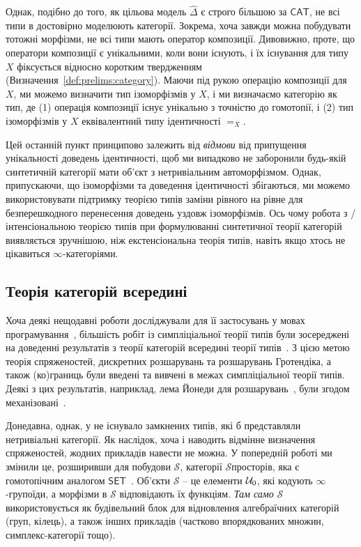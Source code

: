\documentclass[12pt]{article}
\newcommand{\textcite}{\cite}
\newcommand{\parencite}{\cite}
\newcommand{\Space}{\mathcal{S}}
\newcommand{\CAT}{\mathsf{CAT}}
\newcommand{\SET}{\mathsf{SET}}
\newcommand{\SIMP}{\Delta}
\newcommand{\PSH}[1]{\widehat{#1}}
\begin{document}
Однак, подібно до того, як цільова модель $\PSH{\SIMP}$ є строго більшою за $\CAT$, не всі типи в \STT{}
достовірно моделюють категорії. Зокрема, хоча завжди можна побудувати тотожні
морфізми, не всі типи мають оператор композиції. Дивовижно, проте, що оператори композиції
є унікальними, коли вони існують, і їх існування для типу $X$ фіксується відносно коротким
твердженням (Визначення~\ref{def:prelims:category}). Маючи під рукою операцію композиції для $X$, ми можемо
визначити тип ізоморфізмів у $X$, і ми визначаємо категорію як тип, де (1)
операція композиції існує унікально з точністю до гомотопії, і (2) тип ізоморфізмів у $X$ еквівалентний типу ідентичності $=_X$.

\begin{rem}
  Цей останній пункт принципово залежить від \emph{відмови} від припущення унікальності доведень ідентичності, щоб ми
  випадково не заборонили будь-якій синтетичній категорії мати об'єкт з нетривіальним
  автоморфізмом. Однак, припускаючи, що ізоморфізми та доведення ідентичності збігаються, ми можемо
  використовувати підтримку теорією типів заміни рівного на рівне для безперешкодного перенесення доведень уздовж
  ізоморфізмів. Ось чому робота з \HoTT{}/інтенсіональною теорією типів при формулюванні синтетичної
  теорії категорій виявляється зручнішою, ніж екстенсіональна теорія типів, навіть якщо хтось не цікавиться
  $\infty$-категоріями.
\end{rem}


\subsection{Теорія категорій всередині \texorpdfstring{\STT{}}{STT}}

Хоча деякі нещодавні роботи досліджували \STT{} для її застосувань у мовах
програмування~\parencite{weaver:2020,gratzer:2024,weaver:phd}, більшість робіт із симпліціальної теорії типів були
зосереджені на доведенні результатів з теорії категорій всередині теорії
типів~\parencite{riehl:2017,riehl:2023,bardomiano:2021,weinberger:phd,buchholtz:2023,weinberger:twosided:2024,weinberger:sums:2024}.
З цією метою теорія спряженостей, дискретних розшарувань та розшарувань Гротендіка, а також (ко)границь були
введені та вивчені в межах симпліціальної теорії типів. Деякі з цих результатів, наприклад,
лема Йонеди для розшарувань~\parencite{riehl:2017}, були згодом
механізовані~\parencite{kudasov:2024}.

Донедавна, однак, у \STT{} не існувало замкнених типів, які б представляли нетривіальні
категорії. Як наслідок, хоча \textcite{riehl:2017} і наводить відмінне визначення спряженостей,
жодних прикладів навести не можна. У попередній роботі ми змінили це,
розширивши \STT{} для побудови $\Space$, категорії $\mathcal{S}$просторів, яка є гомотопічним аналогом $\SET$~\parencite{gratzer:2024}.
Об'єкти $\Space$ -- це елементи $\Uni[0]$, які кодують $\infty$-групоїди, а морфізми в
$\Space$ відповідають їх функціям. \emph{Там само} $\Space$ використовується як будівельний блок для
відновлення алгебраїчних категорій (груп, кілець), а також інших прикладів (частково впорядкованих множин,
симплекс-категорії тощо).
\end{document}
